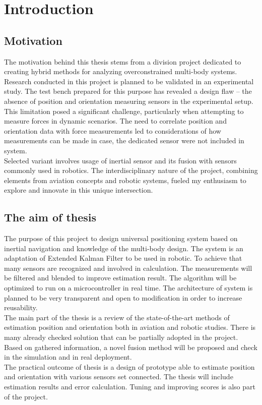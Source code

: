 \section{Introduction}

\subsection{Motivation}

The motivation behind this thesis stems from a division project dedicated to creating hybrid methods for analyzing overconstrained multi-body systems. Research conducted in this project is planned to be validated in an experimental study. The test bench prepared for this purpose has revealed a design flaw -- the absence of position and orientation measuring sensors in the experimental setup. This limitation posed a significant challenge, particularly when attempting to measure forces in dynamic scenarios. The need to correlate position and orientation data with force measurements led to considerations of how measurements can be made in case, the dedicated sensor were not included in system.\\

Selected variant involves usage of inertial sensor and its fusion with sensors commonly used in robotics. The interdisciplinary nature of the project, combining elements from aviation concepts and robotic systems, fueled my enthusiasm to explore and innovate in this unique intersection.

\subsection{The aim of thesis}

The purpose of this project to design universal positioning system based on inertial navigation and knowledge of the multi-body design. The system is an adaptation of Extended Kalman Filter to be used in robotic. To achieve that many sensors are recognized and involved in calculation. The measurements will be filtered and blended to improve estimation result. The algorithm will be optimized to run on a microcontroller in real time. The architecture of system is planned to be very transparent and open to modification in order to increase reusability.\\

The main part of the thesis is a review of the state-of-the-art methods of estimation position and orientation both in aviation and robotic studies. There is many already checked solution that can be partially adopted in the project. Based on gathered information, a novel fusion method will be proposed and check in the simulation and in real deployment.\\

The practical outcome of thesis is a design of prototype able to estimate position and orientation with various sensors set connected. The thesis will include estimation results and error calculation. Tuning and improving scores is also part of the project.